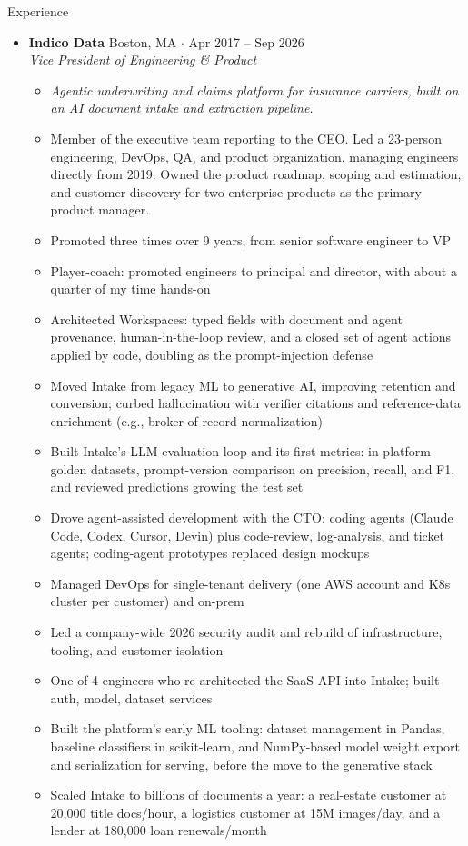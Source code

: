\documentclass[10pt,oneside]{article}
\newenvironment{ressection}[1]{
  \vspace{4pt}
  {\fontfamily{phv}\selectfont\Large#1}
  \begin{itemize}
    \vspace{3pt}
}{
  \end{itemize}
}
\newcommand{\ressubitem}[1]{
  \vspace{-1pt}
\item \begin{flushleft} #1 \end{flushleft}
}
\newcommand{\rescontext}[1]{
  \vspace{-3pt}
\item[] \begin{flushleft} \textit{\small #1} \end{flushleft}
}
\newcommand{\resscope}[1]{
  \vspace{-3pt}
\item[] \begin{flushleft} #1 \end{flushleft}
}
\newcommand{\resbigitem}[3]{
  \vspace{-5pt}
\item
  \textbf{#1} \hfill #2 \\
  \textit{#3}
}
\newenvironment{ressubsec}[3]{
  \resbigitem{#1}{#2}{#3}
  \vspace{-2pt}
  \begin{itemize}
}{
  \end{itemize}
}
\begin{document}
\begin{ressection}{Experience}

  \begin{ressubsec}{Indico Data}{Boston, MA \; $\cdot$ \; Apr 2017 -- Sep 2026}{Vice President of Engineering \& Product}
    \rescontext{Agentic underwriting and claims platform for insurance carriers, built on an AI document intake and extraction pipeline.}
    \resscope{Member of the executive team reporting to the CEO. Led a 23-person engineering, DevOps, QA, and product organization, managing engineers directly from 2019. Owned the product roadmap, scoping and estimation, and customer discovery for two enterprise products as the primary product manager.}
    \ressubitem{Promoted three times over 9 years, from senior software engineer to VP}
    \ressubitem{Player-coach: promoted engineers to principal and director, with about a quarter of my time hands-on}
    \ressubitem{Architected Workspaces: typed fields with document and agent provenance, human-in-the-loop review, and a closed set of agent actions applied by code, doubling as the prompt-injection defense}
    \ressubitem{Moved Intake from legacy ML to generative AI, improving retention and conversion; curbed hallucination with verifier citations and reference-data enrichment (e.g., broker-of-record normalization)}
    \ressubitem{Built Intake's LLM evaluation loop and its first metrics: in-platform golden datasets, prompt-version comparison on precision, recall, and F1, and reviewed predictions growing the test set}
    \ressubitem{Drove agent-assisted development with the CTO: coding agents (Claude Code, Codex, Cursor, Devin) plus code-review, log-analysis, and ticket agents; coding-agent prototypes replaced design mockups}
    \ressubitem{Managed DevOps for single-tenant delivery (one AWS account and K8s cluster per customer) and on-prem}
    \ressubitem{Led a company-wide 2026 security audit and rebuild of infrastructure, tooling, and customer isolation}
    \ressubitem{One of 4 engineers who re-architected the SaaS API into Intake; built auth, model, dataset services}
    \ressubitem{Built the platform's early ML tooling: dataset management in Pandas, baseline classifiers in scikit-learn, and NumPy-based model weight export and serialization for serving, before the move to the generative stack}
    \ressubitem{Scaled Intake to billions of documents a year: a real-estate customer at 20{,}000 title docs/hour, a logistics customer at 15M images/day, and a lender at 180{,}000 loan renewals/month}
  \end{ressubsec}


\end{ressection}
\end{document}
